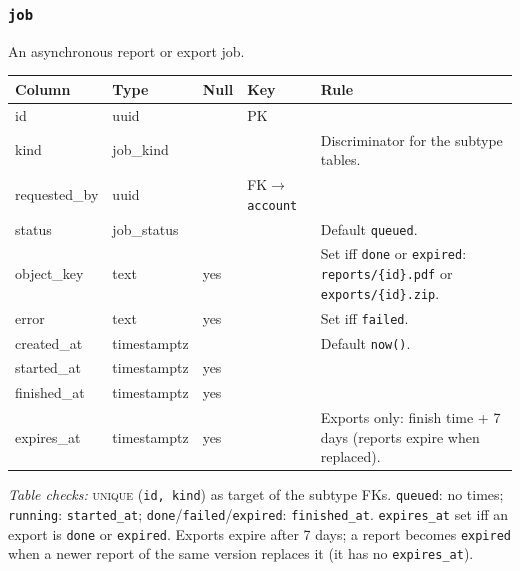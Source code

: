 \documentclass[11pt,a4paper]{article}
\begin{document}
\subsubsection*{\texttt{job}}
\noindent An asynchronous report or export job.\par\vspace{2pt}
{\footnotesize\setlength{\tabcolsep}{4pt}\noindent\begin{tabularx}{\linewidth}{@{}>{\ttfamily\raggedright\arraybackslash}p{3.2cm} >{\ttfamily\raggedright\arraybackslash}p{3.15cm} >{\centering\arraybackslash}p{0.6cm} >{\raggedright\arraybackslash}p{3.85cm} Y@{}}
\toprule{}\normalfont Column & \normalfont Type & Null & Key & Rule \\ \midrule
id & uuid &  & PK &  \\
kind & job\_kind &  &  & Discriminator for the subtype tables. \\
requested\_by & uuid &  & FK$\to$\texttt{account} &  \\
status & job\_status &  &  & Default \texttt{queued}. \\
object\_key & text & yes &  & Set iff \texttt{done} or \texttt{expired}: \texttt{reports/\{id\}.pdf} or \texttt{exports/\{id\}.zip}. \\
error & text & yes &  & Set iff \texttt{failed}. \\
created\_at & timestamptz &  &  & Default \texttt{now()}. \\
started\_at & timestamptz & yes &  &  \\
finished\_at & timestamptz & yes &  &  \\
expires\_at & timestamptz & yes &  & Exports only: finish time + 7 days (reports expire when replaced). \\
\bottomrule\end{tabularx}}
{\footnotesize\noindent\textit{Table checks:} \textsc{unique} (\texttt{id, kind}) as target of the subtype FKs. \texttt{queued}: no times; \texttt{running}: \texttt{started\_at}; \texttt{done}/\texttt{failed}/\texttt{expired}: \texttt{finished\_at}. \texttt{expires\_at} set iff an export is \texttt{done} or \texttt{expired}. Exports expire after 7 days; a report becomes \texttt{expired} when a newer report of the same version replaces it (it has no \texttt{expires\_at}).\par}

\end{document}
